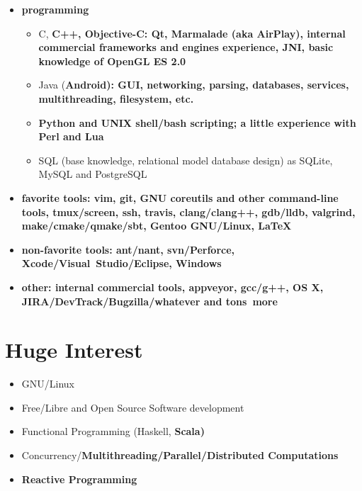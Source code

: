 \begin{itemize}

\item \bfseries programming\mdseries

    \begin{itemize}
    \item C, \bfseries C++\mdseries, Objective-C:
    Qt, Marmalade (aka AirPlay), internal commercial frameworks and engines experience,
    \bfseries JNI\mdseries, basic knowledge of OpenGL ES 2.0


    \item Java (\bfseries Android\mdseries):
    GUI, networking, parsing, databases, services, multithreading, filesystem, etc.


    \item \bfseries Python \mdseries and UNIX \bfseries shell/bash \mdseries scripting;
    a little experience with Perl and Lua

    \item SQL (base knowledge, relational model database design) as SQLite, MySQL and PostgreSQL
    \end{itemize}

\item \bfseries favorite tools\mdseries:
vim, \bfseries git\mdseries, GNU \bfseries coreutils \mdseries and other command-line tools, tmux/screen, \bfseries ssh\mdseries, travis,
clang/clang++, gdb/lldb, valgrind, make/cmake/qmake/sbt, \bfseries Gentoo GNU/Linux\mdseries, \LaTeX
\item \bfseries non-favorite tools\mdseries: ant/nant, svn/Perforce, Xcode/Visual~Studio/Eclipse, Windows
\item \bfseries other\mdseries: internal commercial tools, appveyor, gcc/g++, OS X, JIRA/DevTrack/Bugzilla/whatever and \bfseries tons~\mdseries more

\end{itemize}

\section{Huge Interest}
\begin{itemize}
\item GNU/Linux
\item Free/Libre and Open Source Software development
\item Functional Programming (Haskell, \bfseries Scala\mdseries)
\item Concurrency/\bfseries Multithreading\mdseries/Parallel/\bfseries Distributed \mdseries Computations
\item \bfseries Reactive \mdseries Programming
\end{itemize}

